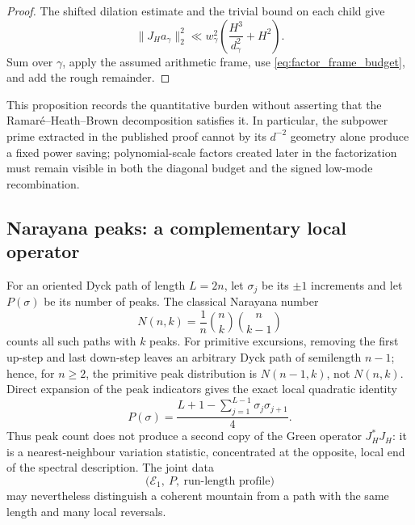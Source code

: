 \documentclass[11pt]{amsart}
\numberwithin{equation}{section}
\theoremstyle{plain}
\theoremstyle{definition}
\theoremstyle{remark}
\begin{document}
\begin{proof}
The shifted dilation estimate and the trivial bound on each child give
\begin{equation}
 \|J_Ha_\gamma\|_2^2
 \ll w_\gamma^2\left(\frac{H^3}{d_\gamma^2}+H^2\right).
\end{equation}
Sum over $\gamma$, apply the assumed arithmetic frame, use
\eqref{eq:factor_frame_budget}, and add the rough remainder.
\end{proof}

This proposition records the quantitative burden without asserting that the
Ramar\'e--Heath--Brown decomposition satisfies it.  In particular, the
subpower prime extracted in the published proof cannot by its $d^{-2}$
geometry alone produce a fixed power saving; polynomial-scale factors created
later in the factorization must remain visible in both the diagonal budget
and the signed low-mode recombination.

\subsection{Narayana peaks: a complementary local operator}
\label{subsec:narayana_peak_operator}

For an oriented Dyck path of length $L=2n$, let $\sigma_j$ be its $\pm1$
increments and let $P(\sigma)$ be its number of peaks.  The classical
Narayana number
\begin{equation}
 N(n,k)=\frac1n\binom nk\binom n{k-1}
\end{equation}
counts all such paths with $k$ peaks.  For primitive excursions, removing the
first up-step and last down-step leaves an arbitrary Dyck path of semilength
$n-1$; hence, for $n\geq2$, the primitive peak distribution is
$N(n-1,k)$, not $N(n,k)$.  Direct expansion of the peak indicators
gives the exact local quadratic identity
\begin{equation}
 \boxed{\;
 P(\sigma)
 =\frac{L+1-\sum_{j=1}^{L-1}\sigma_j\sigma_{j+1}}4.\;}
\label{eq:peak_local_quadratic}
\end{equation}
Thus peak count does not produce a second copy of the Green operator
$J_H^*J_H$: it is a nearest-neighbour variation statistic, concentrated at
the opposite, local end of the spectral description.  The joint data
\begin{equation}
 \bigl(\mathcal E_1,\ P,\ \text{run-length profile}\bigr)
\label{eq:joint_energy_peak_runs}
\end{equation}
may nevertheless distinguish a coherent mountain from a path with the same
length and many local reversals.
\end{document}
